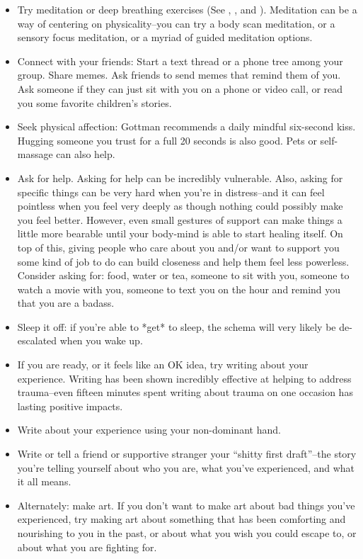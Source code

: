 \documentclass[12pt,letterpaper]{book}
\begin{document}
\begin{itemize}
    \item Try meditation or deep breathing exercises (See \textcite{rain}, \textcite{bodyscan}, and \textcite{lkMeditation}). Meditation can be a way of centering on physicality–you can try a body scan meditation, or a sensory focus meditation, or a myriad of guided meditation options.
    \item Connect with your friends: Start a text thread or a phone tree among your group. Share memes. Ask friends to send memes that remind them of you. Ask someone if they can just sit with you on a phone or video call, or read you some favorite children's stories.
    \item Seek physical affection: Gottman recommends a daily mindful six-second kiss. Hugging someone you trust for a full 20 seconds is also good. Pets or self-massage can also help.
    \item Ask for help. Asking for help can be incredibly vulnerable. Also, asking for specific things can be very hard when you're in distress–and it can feel pointless when you feel very deeply as though nothing could possibly make you feel better. However, even small gestures of support can make things a little more bearable until your body-mind is able to start healing itself. On top of this, giving people who care about you and/or want to support you some kind of job to do can build closeness and help them feel less powerless. Consider asking for: food, water or tea, someone to sit with you, someone to watch a movie with you, someone to text you on the hour and remind you that you are a badass.
    \item Sleep it off: if you're able to *get* to sleep, the schema will very likely be de-escalated when you wake up.
    \item If you are ready, or it feels like an OK idea, try writing about your experience. Writing has been shown incredibly effective at helping to address trauma–even fifteen minutes spent writing about trauma on one occasion has lasting positive impacts.
    \item Write about your experience using your non-dominant hand.
    \item Write or tell a friend or supportive stranger your “shitty first draft”–the story you're telling yourself about who you are, what you've experienced, and what it all means.
    \item Alternately: make art. If you don't want to make art about bad things you've experienced, try making art about something that has been comforting and nourishing to you in the past, or about what you wish you could escape to, or about what you are fighting for.

\end{itemize}
\end{document}
